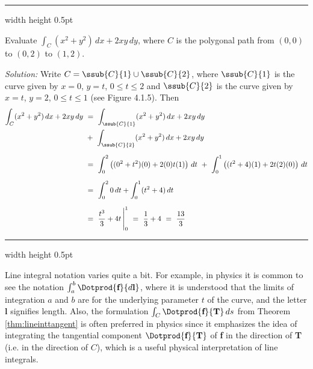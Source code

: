 \vspace{3mm}
\hrule width \textwidth height 0.5pt
\begin{exa}\label{exa:lineintexapoly}
 Evaluate $\int_C (x^2 + y^2 )\,dx + 2xy\,dy$, where $C$ is the polygonal path from $(0,0)$ to $(0,2)$ to
 $(1,2)$.\vspace{1mm}

 \piccaption[]{}
 \par\noindent \emph{Solution:} Write $C = \ssub{C}{1} \cup \ssub{C}{2}$, where $\ssub{C}{1}$ is the curve given by
 $x=0$, $y=t$, $0 \le t \le 2$ and $\ssub{C}{2}$ is the curve given by $x=t$, $y=2$, $0 \le t \le 1$ (see Figure
 4.1.5). Then
 \begin{align*}
  \int_C (x^2 + y^2 )\,dx + 2xy\,dy ~&=~ \int_{\ssub{C}{1}} (x^2 + y^2 )\,dx + 2xy\,dy\\
   &+~ \int_{\ssub{C}{2}} (x^2 + y^2 )\,dx + 2xy\,dy\\[6pt]
   &=~ \int_0^2 \left( (0^2 + t^2 )(0) + 2(0)t(1) \right) \,dt ~+~
    \int_0^1 \left( (t^2 + 4 )(1) + 2t(2)(0) \right) \,dt\\[6pt]
   &=~ \int_0^2 0\,dt + \int_0^1 (t^2 + 4 )\,dt\\[6pt]
   &=~ \frac{t^3}{3} + 4t \,\Bigg|_0^1 ~=~ \frac{1}{3} + 4 ~=~ \frac{13}{3}
 \end{align*}
\end{exa}
\hrule width \textwidth height 0.5pt
\vspace{3mm}

Line integral notation varies quite a bit. For example, in physics it is common to see the notation
$\int_a^b \Dotprod{\textbf{f}}{d\textbf{l}}$, where it is understood that the limits of integration $a$ and $b$ are for
the underlying parameter $t$ of the curve, and the letter \textbf{l} signifies length. Also, the formulation
$\int_C \Dotprod{\textbf{f}}{\textbf{T}}\,ds$ from Theorem \ref{thm:lineinttangent} is often preferred in physics since
it emphasizes the idea of integrating the tangential component $\Dotprod{\textbf{f}}{\textbf{T}}$ of \textbf{f} in the
direction of \textbf{T} (i.e. in the direction of $C$), which is a useful physical interpretation of line integrals.
